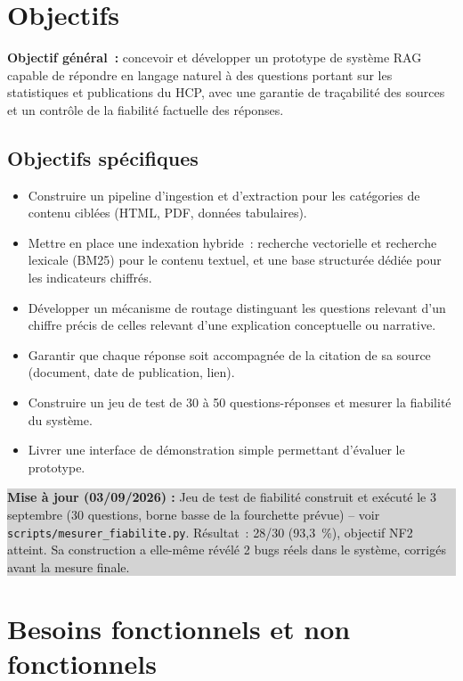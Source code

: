 \documentclass[11pt,a4paper]{article}
\newcommand{\majcadrage}[1]{%
\par\vspace{0.35cm}
\noindent\colorbox{lightgrey}{%
\begin{minipage}{\dimexpr\linewidth-2\fboxsep}
\vspace{0.15cm}
\textbf{\color{gold}Mise \`a jour (03/09/2026) :} #1
\vspace{0.15cm}
\end{minipage}%
}
\vspace{0.35cm}
}
\begin{document}
\section{Objectifs}
\textbf{Objectif g\'en\'eral~:} concevoir et d\'evelopper un prototype de syst\`eme RAG capable de r\'epondre en langage naturel \`a des questions portant sur les statistiques et publications du HCP, avec une garantie de tra\c{c}abilit\'e des sources et un contr\^ole de la fiabilit\'e factuelle des r\'eponses.

\subsection{Objectifs sp\'ecifiques}
\begin{itemize}
\item Construire un pipeline d'ingestion et d'extraction pour les cat\'egories de contenu cibl\'ees (HTML, PDF, donn\'ees tabulaires).
\item Mettre en place une indexation hybride~: recherche vectorielle et recherche lexicale (BM25) pour le contenu textuel, et une base structur\'ee d\'edi\'ee pour les indicateurs chiffr\'es.
\item D\'evelopper un m\'ecanisme de routage distinguant les questions relevant d'un chiffre pr\'ecis de celles relevant d'une explication conceptuelle ou narrative.
\item Garantir que chaque r\'eponse soit accompagn\'ee de la citation de sa source (document, date de publication, lien).
\item Construire un jeu de test de 30 \`a 50 questions-r\'eponses et mesurer la fiabilit\'e du syst\`eme.
\item Livrer une interface de d\'emonstration simple permettant d'\'evaluer le prototype.
\end{itemize}

\majcadrage{Jeu de test de fiabilit\'e construit et ex\'ecut\'e le 3 septembre (30 questions, borne basse de la fourchette pr\'evue) -- voir \texttt{scripts/mesurer\_fiabilite.py}. R\'esultat~: 28/30 (93,3~\%), objectif NF2 atteint. Sa construction a elle-m\^eme r\'ev\'el\'e 2 bugs r\'eels dans le syst\`eme, corrig\'es avant la mesure finale.}

\section{Besoins fonctionnels et non fonctionnels}
\end{document}
